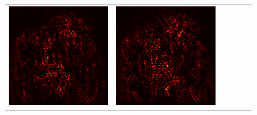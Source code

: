 \documentclass[preprint,12pt]{elsarticle}
\begin{document}
\begin{figure}[p]
\begin{tabular}{cccccc}
  \includegraphics[scale=\scale]{../visualizations/examples/imagenette/resnet18/active_saliency_map/8.png} & 
  \includegraphics[scale=\scale]{../visualizations/examples/imagenette/resnet18/inactive_saliency_map/8.png} \\
  

\end{tabular}
\end{figure}
\end{document}

